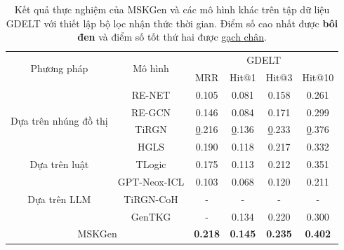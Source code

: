 \begin{table}[H]
\caption{Kết quả thực nghiệm của MSKGen và các mô hình khác trên tập dữ liệu GDELT với thiết lập bộ lọc nhận thức thời gian. 
Điểm số cao nhất được \textbf{bôi đen} và điểm số tốt thứ hai được \underline{gạch chân}.}
\label{tab:table55}
\begin{adjustbox}{width=\textwidth}
\begin{tabular}{|cc|cccc|}
\hline
\multicolumn{1}{|c|}{\multirow{2}{*}{Phương pháp}}     & \multirow{2}{*}{Mô hình} & \multicolumn{4}{c|}{GDELT}                                                                          \\ \cline{3-6} 
\multicolumn{1}{|c|}{}                                 &                          & \multicolumn{1}{c|}{MRR} & \multicolumn{1}{c|}{Hit@1} & \multicolumn{1}{c|}{Hit@3} & Hit@10         \\ \hline
\multicolumn{1}{|c|}{\multirow{4}{*}{Dựa trên nhúng đồ thị}} & RE-NET                   & 0.105                    & 0.081                      & 0.158                      & 0.261          \\ \cline{2-2}
\multicolumn{1}{|c|}{}                                 & RE-GCN                   & 0.146                    & 0.084                      & 0.171                      & 0.299          \\ \cline{2-2}
\multicolumn{1}{|c|}{}                                 & TiRGN                    & {\ul 0.216}              & {\ul 0.136}                & {\ul 0.233}                & {\ul 0.376}    \\ \cline{2-2}
\multicolumn{1}{|c|}{}                                 & HGLS                     & 0.190                    & 0.118                      & 0.217                      & 0.332          \\ \hline
\multicolumn{1}{|c|}{Dựa trên luật}                    & TLogic                   & 0.175                    & 0.113                      & 0.212                      & 0.351          \\ \hline
\multicolumn{1}{|c|}{\multirow{3}{*}{Dựa trên LLM}}    & GPT-Neox-ICL             & 0.103                    & 0.068                      & 0.120                      & 0.211          \\ \cline{2-2}
\multicolumn{1}{|c|}{}                                 & TiRGN-CoH                & -                        & -                          & -                          & -              \\ \cline{2-2}
\multicolumn{1}{|c|}{}                                 & GenTKG                   & -                        & 0.134                      & 0.220                      & 0.300          \\ \hline
\multicolumn{2}{|c|}{MSKGen}                                                      & \textbf{0.218}           & \textbf{0.145}             & \textbf{0.235}             & \textbf{0.402} \\ \hline
\end{tabular}
\end{adjustbox}  
\end{table}
\vspace{-5mm}

